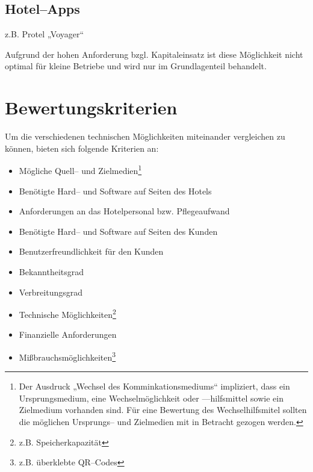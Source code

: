 \subsection{Hotel--Apps} %
\label{sub:hotel_apps}

z.B. Protel „Voyager“

Aufgrund der hohen Anforderung bzgl. Kapitaleinsatz ist diese Möglichkeit nicht optimal für kleine Betriebe und wird nur im Grundlagenteil behandelt.




\newpage
\section{Bewertungskriterien} %
\label{sec:kriterien}

Um die verschiedenen technischen Möglichkeiten miteinander vergleichen zu können, bieten sich folgende Kriterien an:

\begin{itemize}
\item Mögliche Quell– und Zielmedien\footnote{Der Ausdruck „Wechsel des Komminkationsmediums“ impliziert, dass ein Ursprungsmedium, eine Wechselmöglichkeit oder —hilfsmittel sowie ein Zielmedium vorhanden sind. Für eine Bewertung des Wechselhilfsmitel sollten die möglichen Ursprungs– und Zielmedien mit in Betracht gezogen werden.}
\item Benötigte Hard-- und Software auf Seiten des Hotels
\item Anforderungen an das Hotelpersonal bzw. Pflegeaufwand
\item Benötigte Hard-- und Software auf Seiten des Kunden
\item Benutzerfreundlichkeit für den Kunden
\item Bekanntheitsgrad 
\item Verbreitungsgrad 
\item Technische Möglichkeiten\footnote{z.B. Speicherkapazität}
\item Finanzielle Anforderungen
\item Mißbrauchsmöglichkeiten\footnote{z.B. überklebte QR--Codes}
\end{itemize}


